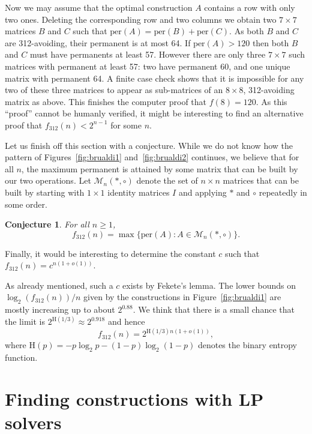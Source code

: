 \documentclass[11pt,english]{article}
\theoremstyle{plain}
\newtheorem{conjecture}[theorem]{Conjecture}
\theoremstyle{remark}
\begin{document}
Now we may assume that the optimal construction $A$ contains a row with only two ones. Deleting the corresponding row and two columns we obtain two $7\times 7$ matrices $B$ and $C$ such that $\text{per}(A)= \text{per}(B) + \text{per}(C)$. As both $B$ and $C$ are 312-avoiding, their permanent is at most 64. If $\text{per}(A)>120$ then both $B$ and $C$ must have permanents at least 57. However there are only three $7\times 7$ such matrices with permanent at least 57: two have permanent 60, and one unique matrix with permanent 64. A finite case check shows that it is impossible for any two of these three matrices to appear as sub-matrices of an $8\times 8$, 312-avoiding matrix as above. This finishes the computer proof that $f(8)=120$.
As this ``proof'' cannot be humanly verified, it might be interesting to find an alternative proof that $f_{312}(n)<2^{n-1}$ for some $n$. 


Let us finish off this section with a conjecture. While we do not know how the pattern of Figures~\ref{fig:brualdi1} and~\ref{fig:brualdi2} continues, we believe that for all $n$, the maximum permanent is attained by some matrix that can be built by our two operations. Let $\mathcal{M}_n(\ast,\circ)$ denote the set of $n\times n$ matrices that can be built by starting with $1\times 1$ identity matrices $I$ and applying $\ast$ and $\circ$ repeatedly in some order. 

\begin{conjecture}
For all $n\geq 1$,
$$f_{312}(n) = \max\{\text{per}(A) : A \in \mathcal{M}_n(\ast,\circ)\}.$$
\end{conjecture}

Finally, it would be interesting to determine the constant $c$ such that $f_{312}(n)=c^{n(1+o(1))}$. 



As already mentioned, such a $c$ exists by Fekete's lemma. The lower bounds on $\log_2(f_{312}(n))/n$ given by the constructions in Figure~\ref{fig:brualdi1} are mostly increasing up to about $2^{0.88}$. We think that there is a small chance that the limit is $2^{\mathrm{H}(1/3)}\approx 2^{0.918}$ and hence
$$f_{312}(n)=2^{\mathrm{H}(1/3)n(1+o(1))},$$ where $\mathrm{H}(p) = -p\log_2p - (1-p)\log_2(1-p)$ denotes the binary entropy function.

\fi





\section{Finding constructions with LP solvers}\label{sec:lp}
\end{document}
